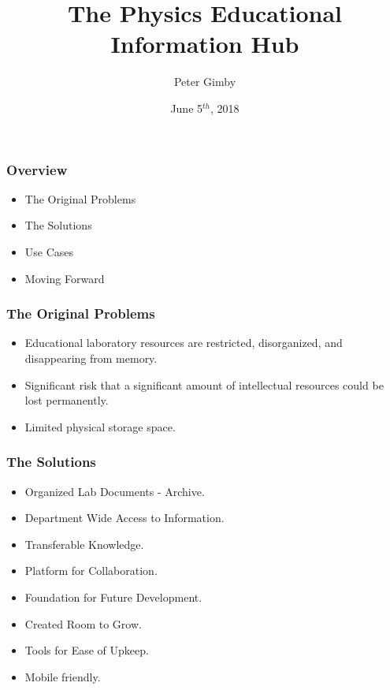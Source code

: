 \documentclass{beamer} %
\title[Lab Information Hub]{The Physics Educational Information Hub}
\author{Peter Gimby}
\institute[UCalgary]{University of Calgary}
\date{June 5$^{th}$, 2018}
\begin{document}
\frame[plain]{\titlepage}

\begin{frame}
\frametitle{Overview}
	\begin{itemize}
		\item{The Original Problems}
		\item{The Solutions}
		\item{Use Cases}
		\item{Moving Forward}
	\end{itemize}
\end{frame}
	
\begin{frame}
\frametitle{The Original Problems}\color{black}
	\begin{itemize}
    		\item Educational laboratory resources are restricted, disorganized, and 							disappearing from memory.
		\item Significant risk that a significant amount of intellectual 									resources could be lost permanently.
		\item Limited physical storage space.
	\end{itemize}
\end{frame}


\begin{frame}
\frametitle{The Solutions}\color{black}
	\begin{itemize}
		\item Organized Lab Documents - Archive.
		\item Department Wide Access to Information.
		\item Transferable Knowledge.
		\item Platform for Collaboration.
		\item Foundation for Future Development.
		\item Created Room to Grow.
		\item Tools for Ease of Upkeep.
		\item Mobile friendly.
	\end{itemize}
\end{frame}
\end{document}
